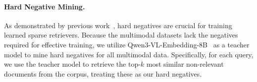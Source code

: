 \paragraph{Hard Negative Mining.} 
As demonstrated by previous work~\citep{spladepp}, hard negatives are crucial for training learned sparse retrievers. 
Because the multimodal datasets lack the negatives required for effective training, we utilize Qwen3-VL-Embedding-8B~\citep{qwenvlembedding} as a teacher model to mine hard negatives for all multimodal data. 
Specifically, for each query, we use the teacher model to retrieve the top-$k$ most similar non-relevant documents from the corpus, treating these as our hard negatives. 
